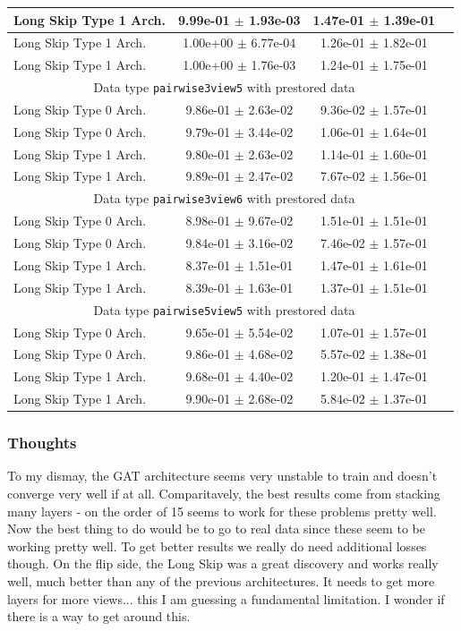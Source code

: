 \documentclass[a4paper]{article}
\begin{document}
\begin{table}[H]
\begin{tabular}{|l|c|c|c|}
Long Skip Type 1 Arch.   & 9.99e-01 $\pm$ 1.93e-03 & 1.47e-01 $\pm$ 1.39e-01 \\ \hline
Long Skip Type 1 Arch.   & 1.00e+00 $\pm$ 6.77e-04 & 1.26e-01 $\pm$ 1.82e-01 \\ \hline
Long Skip Type 1 Arch.   & 1.00e+00 $\pm$ 1.76e-03 & 1.24e-01 $\pm$ 1.75e-01 \\ \hline
\multicolumn{3}{|c|}{Data type \texttt{pairwise3view5} with prestored data} \\ \hline
Long Skip Type 0 Arch.   & 9.86e-01 $\pm$ 2.63e-02 & 9.36e-02 $\pm$ 1.57e-01 \\ \hline
Long Skip Type 0 Arch.   & 9.79e-01 $\pm$ 3.44e-02 & 1.06e-01 $\pm$ 1.64e-01 \\ \hline
Long Skip Type 1 Arch.   & 9.80e-01 $\pm$ 2.63e-02 & 1.14e-01 $\pm$ 1.60e-01 \\ \hline
Long Skip Type 1 Arch.   & 9.89e-01 $\pm$ 2.47e-02 & 7.67e-02 $\pm$ 1.56e-01 \\ \hline
\multicolumn{3}{|c|}{Data type \texttt{pairwise3view6} with prestored data} \\ \hline
Long Skip Type 0 Arch.   & 8.98e-01 $\pm$ 9.67e-02 & 1.51e-01 $\pm$ 1.51e-01 \\ \hline
Long Skip Type 0 Arch.   & 9.84e-01 $\pm$ 3.16e-02 & 7.46e-02 $\pm$ 1.57e-01 \\ \hline
Long Skip Type 1 Arch.   & 8.37e-01 $\pm$ 1.51e-01 & 1.47e-01 $\pm$ 1.61e-01 \\ \hline
Long Skip Type 1 Arch.   & 8.39e-01 $\pm$ 1.63e-01 & 1.37e-01 $\pm$ 1.51e-01 \\ \hline
\multicolumn{3}{|c|}{Data type \texttt{pairwise5view5} with prestored data} \\ \hline
Long Skip Type 0 Arch.   & 9.65e-01 $\pm$ 5.54e-02 & 1.07e-01 $\pm$ 1.57e-01 \\ \hline
Long Skip Type 0 Arch.   & 9.86e-01 $\pm$ 4.68e-02 & 5.57e-02 $\pm$ 1.38e-01 \\ \hline
Long Skip Type 1 Arch.   & 9.68e-01 $\pm$ 4.40e-02 & 1.20e-01 $\pm$ 1.47e-01 \\ \hline
Long Skip Type 1 Arch.   & 9.90e-01 $\pm$ 2.68e-02 & 5.84e-02 $\pm$ 1.37e-01 \\ \hline
      \end{tabular}
      \label{fig:tab1}
\end{table}



\subsubsection*{Thoughts}
To my dismay, the GAT architecture seems very unstable to train and doesn't converge very well if at all. Comparitavely, the best results come from stacking many layers - on the order of 15 seems to work for these problems pretty well. Now the best thing to do would be to go to real data since these seem to be working pretty well. To get better results we really do need additional losses though.
On the flip side, the Long Skip was a great discovery and works really well, much better than any of the previous architectures. It needs to get more layers for more views... this I am guessing a fundamental limitation. I wonder if there is a way to get around this.
\end{document}
